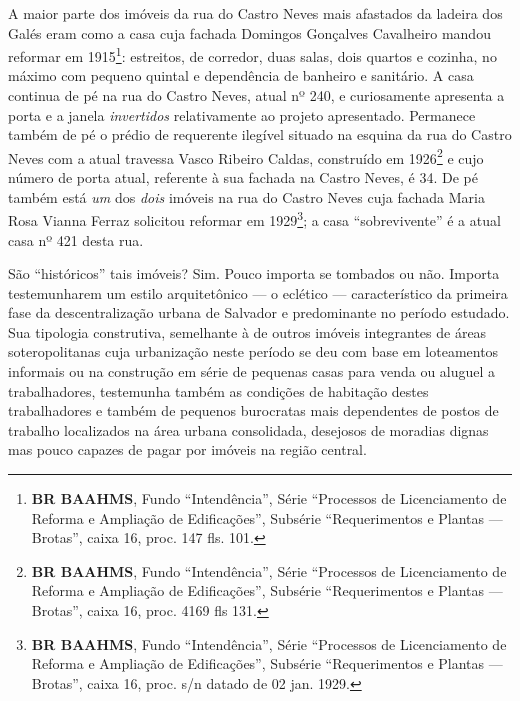 A maior parte dos imóveis da rua do Castro Neves mais afastados da ladeira dos Galés eram como a casa cuja fachada Domingos Gonçalves Cavalheiro mandou reformar em 1915\footnote{\textbf{BR BAAHMS}, Fundo ``Intendência'', Série ``Processos de Licenciamento de Reforma e Ampliação de Edificações'', Subsérie ``Requerimentos e Plantas --- Brotas'', caixa 16, proc. 147 fls. 101.}: estreitos, de corredor, duas salas, dois quartos e cozinha, no máximo com pequeno quintal e dependência de banheiro e sanitário. A casa continua de pé na rua do Castro Neves, atual nº 240, e curiosamente apresenta a porta e a janela \textit{invertidos} relativamente ao projeto apresentado. Permanece também de pé o prédio de requerente ilegível situado na esquina da rua do Castro Neves com a atual travessa Vasco Ribeiro Caldas, construído em 1926\footnote{\textbf{BR BAAHMS}, Fundo ``Intendência'', Série ``Processos de Licenciamento de Reforma e Ampliação de Edificações'', Subsérie ``Requerimentos e Plantas --- Brotas'', caixa 16, proc. 4169 fls 131.} e cujo número de porta atual, referente à sua fachada na Castro Neves, é 34. De pé também está \textit{um} dos \textit{dois} imóveis na rua do Castro Neves cuja fachada Maria Rosa Vianna Ferraz solicitou reformar em 1929\footnote{\textbf{BR BAAHMS}, Fundo ``Intendência'', Série ``Processos de Licenciamento de Reforma e Ampliação de Edificações'', Subsérie ``Requerimentos e Plantas --- Brotas'', caixa 16, proc. s/n datado de 02 jan. 1929.}; a casa ``sobrevivente'' é a atual casa nº 421 desta rua.

São ``históricos'' tais imóveis? Sim. Pouco importa se tombados ou não. Importa testemunharem um estilo arquitetônico --- o eclético --- característico da primeira fase da descentralização urbana de Salvador e predominante no período estudado. Sua tipologia construtiva, semelhante à de outros imóveis integrantes de áreas soteropolitanas cuja urbanização neste período se deu com base em loteamentos informais ou na construção em série de pequenas casas para venda ou aluguel a trabalhadores, testemunha também as condições de habitação destes trabalhadores e também de pequenos burocratas mais dependentes de postos de trabalho localizados na área urbana consolidada, desejosos de moradias dignas mas pouco capazes de pagar por imóveis na região central.

